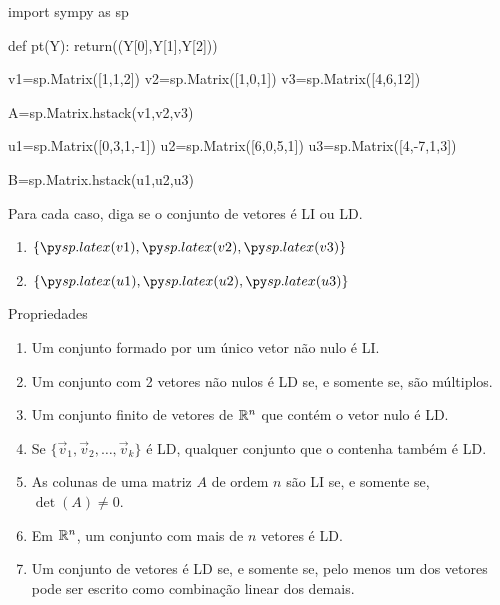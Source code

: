 \begin{frame}[label=lild,fragile=singleslide]{}
\begin{pycode}
import sympy as sp

def pt(Y):
 return((Y[0],Y[1],Y[2]))

v1=sp.Matrix([1,1,2])
v2=sp.Matrix([1,0,1])
v3=sp.Matrix([4,6,12])

A=sp.Matrix.hstack(v1,v2,v3)


u1=sp.Matrix([0,3,1,-1])
u2=sp.Matrix([6,0,5,1])
u3=sp.Matrix([4,-7,1,3])

B=sp.Matrix.hstack(u1,u2,u3)
\end{pycode}
\begin{casa}
Para cada caso, diga se o conjunto de vetores é LI ou LD.

\begin{enumerate}
\item $\left\{\pyl{v1},\pyl{v2}, \pyl{v3}\right\}$
\item $\left\{\pyl{u1},\pyl{u2}, \pyl{u3}\right\}$
\end{enumerate}
\end{casa}

\end{frame}

\begin{frame}[label=lild]{Propriedades}

\begin{enumerate}
\item Um conjunto formado por um único vetor não nulo é LI.

\item Um conjunto com 2 vetores não nulos é LD se, e somente se, são múltiplos.

\item Um conjunto finito de vetores de $\mathbb{R}^n$ que contém o vetor nulo é LD.

\item Se $\{\vec{v}_1,\vec{v}_2,\ldots,\vec{v}_k\}$ é LD, qualquer conjunto que o contenha também é LD.

\item As colunas de uma matriz $A$ de ordem $n$ são LI se, e somente se, $\det(A)\neq 0$.

\item Em $\mathbb{R}^n$, um conjunto com mais de $n$ vetores é LD.

\item Um conjunto de vetores é LD se, e somente se, {\color{red} pelo menos um dos vetores} pode ser escrito como combinação linear dos demais.
\end{enumerate}


\end{frame}

